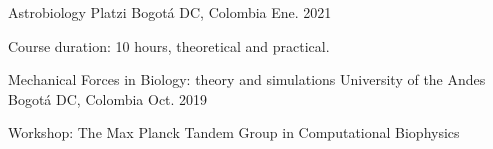 \begin{cventries}

\cventry
{Astrobiology} %
{Platzi} %
{Bogotá DC, Colombia} %
{Ene. 2021} %
{ %
\begin{cvitems}
\item {Course duration: 10 hours, theoretical and practical.}
\end{cvitems}
}


\cventry
{Mechanical Forces in Biology: theory and simulations} %
{University of the Andes} %
{Bogotá DC, Colombia} %
{Oct. 2019} %
{ %
\begin{cvitems}
\item {Workshop: The Max Planck Tandem Group in Computational Biophysics}
\end{cvitems}
}


\end{cventries}
